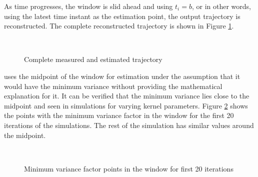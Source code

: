 \documentclass[letterpaper%
, twoside%
, 12pt%
,memoire%
, english%
,creativecommons,hyperref%
]{thETS}
\begin{document}
As time progresses, the window is slid ahead and using $t_i=b$, or in other words, using the latest time instant as the estimation point, the output trajectory is reconstructed. The complete reconstructed trajectory is shown in Figure \ref{Fig:recon}.\\
\begin{figure}[H]
	\centering
	 \\ \parbox{0.75\textwidth}{\caption{Complete measured and estimated trajectory\label{Fig:recon}}}
\end{figure}

\citep{RN120} uses the midpoint of the window for estimation under the assumption that it would have the minimum variance without providing the mathematical explanation for it. It can be verified that the minimum variance lies close to the midpoint and seen in simulations for varying kernel parameters. Figure \ref{Fig:minVarPts} shows the points with the minimum variance factor in the window for the first 20 iterations of the simulations. The rest of the simulation has similar values around the midpoint. 

\begin{figure}
	\centering
	 \\ \parbox{0.75\textwidth}{\caption{Minimum variance factor points in the window for first 20 iterations}\label{Fig:minVarPts}}
\end{figure}
\FloatBarrier
\end{document}
